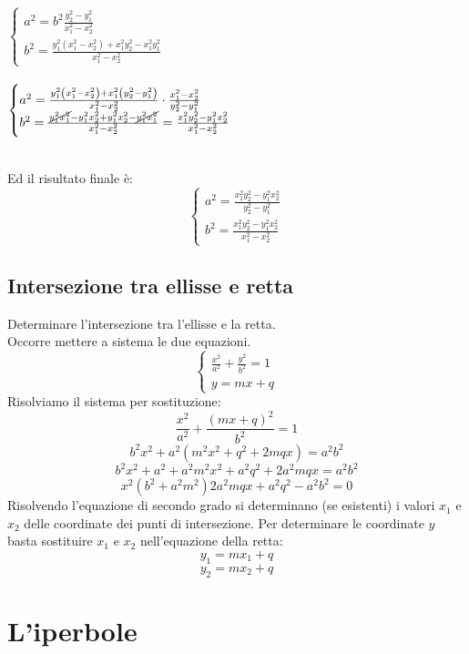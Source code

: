 \documentclass[12pt]{book}
\begin{document}
\begin{multicols}{2}
			$\begin{cases}
				a^2=b^2\frac{y_2^2-y_1^2}{x_1^2-x_2^2}\\
				b^2=\frac{y_1^2\left(x_1^2-x_2^2\right)+x_1^2y_2^2-x_1^2y_1^2}{x_1^2-x_2^2}
			\end{cases}$\\\\
			$\begin{cases}
				a^2=\frac{y_1^2\left(x_1^2-x_2^2\right)+x_1^2\left(y_2^2-y_1^2\right)}{x_1^2-x_2^2}\cdot \frac{x_1^2-x_2^2}{y_2^2-y_1^2}\\
				b^2=\frac{\cancel{y_1^2x_1^2}-y_1^2x_2^2+y_1^2x_2^2-\cancel{y_1^2x_1^2}}{x_1^2-x_2^2}=\frac{x_1^2y_2^2-y_1^2x_2^2}{x_1^2-x_2^2}
			\end{cases}$\\\\
			\end{multicols}
			Ed il risultato finale è:
			\[\begin{cases}
				a^2=\frac{x_1^2y_2^2-y_1^2x_2^2}{y_2^2-y_1^2}\\
				b^2=\frac{x_1^2y_2^2-y_1^2x_2^2}{x_1^2-x_2^2}
			\end{cases}\]
			\section{Intersezione tra ellisse e retta}
			Determinare l'intersezione tra l'ellisse e la retta.\\
			Occorre mettere a sistema le due equazioni.
			\[\begin{cases}
				\frac{x^2}{a^2}+\frac{y^2}{b^2}=1\\
				y=mx+q
			\end{cases}\]
			Risolviamo il sistema per sostituzione:
			\[\frac{x^2}{a^2}+\frac{\left(mx+q\right)^2}{b^2}=1\]
			\[b^2x^2+a^2\left(m^2x^2+q^2+2mqx\right)=a^2b^2\]
			\[b^2x^2+a^2+a^2m^2x^2+a^2q^2+2a^2mqx=a^2b^2\]
			\[x^2\left(b^2+a^2m^2\right)2a^2mqx+a^2q^2-a^2b^2=0\]
			Risolvendo l'equazione di secondo grado si determinano (se esistenti) i valori $x_1$ e $x_2$ delle coordinate dei punti di intersezione. Per determinare le coordinate $y$ basta sostituire $x_1$ e $x_2$ nell'equazione della retta:
			\[y_1=mx_1+q\]
			\[y_2=mx_2+q\]
			
	\chapter{L'iperbole}
\end{document}
